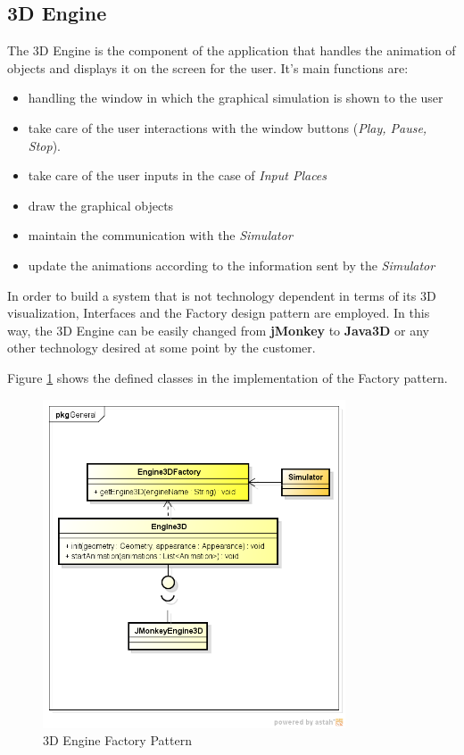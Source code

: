 \subsection{3D Engine}

The 3D Engine is the component of the application that handles the animation of objects and displays it on the screen for the user. It's main functions are: 

\begin{itemize}
\item handling the window in which the graphical simulation is shown to the user
\item take care of the user interactions with the window buttons (\textit{Play, Pause, Stop}).
\item take care of the user inputs in the case of \textit{Input Places}
\item draw the graphical objects
\item maintain the communication with the \textit{Simulator}
\item update the animations according to the information sent by the \textit{Simulator}
\end{itemize}

In order to build a system that is not technology dependent in terms of its 3D visualization, Interfaces and the Factory design pattern are employed. In this way, the 3D Engine can be easily changed from \textbf{jMonkey} to \textbf{Java3D} or any other technology desired at some point by the customer. 

Figure \ref{fig:factory} shows the defined classes in the implementation of the Factory pattern.

\begin{figure}[htp]
\begin{center}
  \includegraphics[width=0.8\textwidth]{image/engine_factory.png}
  \caption{3D Engine Factory Pattern}
  \label{fig:factory}
\end{center}
\end{figure} 

